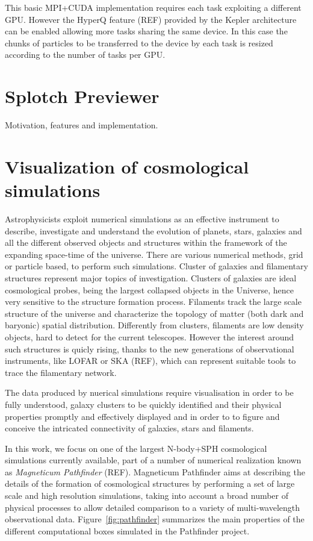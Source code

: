 \documentclass{egpubl}
\begin{document}
This basic MPI+CUDA implementation requires each task exploiting a different GPU. However the HyperQ  feature (REF) provided by the Kepler architecture can be enabled allowing more tasks sharing the same device. In this case the chunks of particles to be transferred to the device by each task is resized according to the number of tasks per GPU.
\section{Splotch Previewer}

Motivation, features and implementation.

\section{Visualization of cosmological simulations}

Astrophysicists exploit numerical simulations as an effective instrument to describe, 
investigate and understand the evolution of planets, stars, galaxies and all
the different observed objects and structures 
within the framework of the expanding space-time of the universe. 
There are various numerical methods, grid or particle based, to
perform such simulations. Cluster of galaxies and filamentary structures represent
major topics of investigation. Clusters of galaxies are ideal cosmological probes, being 
the largest collapsed objects in the Universe, hence very sensitive to the structure formation process.
Filaments track the large scale structure of the universe and characterize the 
topology of matter (both dark and baryonic) spatial distribution. Differently from clusters,
filaments are low density objects, hard to detect for the current telescopes. However the interest
around such structures is quicly rising, thanks to the new generations of observational
instruments, like LOFAR or SKA (REF), which can represent suitable tools to trace the filamentary network.

The data produced by nuerical simulations require visualisation in order to be fully 
understood, galaxy clusters to be quickly identified and 
their physical properties promptly and effectively displayed and in order to 
to figure and conceive the intricated  
connectivity of galaxies, stars and filaments.

In this work, we focus on one of the largest N-body+SPH cosmological simulations
currently available, part of a number of numerical realization known as {\it Magneticum 
Pathfinder} (REF). Magneticum Pathfinder aims at describing the details of the formation 
of cosmological structures by performing a set of large scale and high resolution simulations, 
taking into account a broad number of physical processes to allow detailed comparison 
to a variety of multi-wavelength observational data. Figure~\ref{fig:pathfinder} summarizes 
the main properties of the different computational boxes simulated in the Pathfinder 
project.
\end{document}

